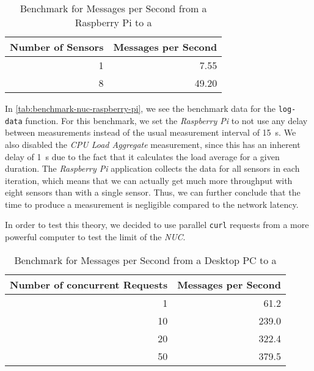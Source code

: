 \begin{table}[H]
  \centering
  \begin{tabular}{|r|r|}
    \hline
    Number of Sensors & Messages per Second \\ \hline
                    1 &                7.55 \\ \hline
                    8 &               49.20 \\ \hline
  \end{tabular}
  \caption{Benchmark for Messages per Second from a Raspberry Pi to a }
  \label{tab:benchmark-nuc-raspberry-pi}
\end{table}

In \autoref{tab:benchmark-nuc-raspberry-pi}, we see the benchmark data for the \texttt{log-data}
function. For this benchmark, we set the \textit{Raspberry Pi} to not use any delay between
measurements instead of the usual measurement interval of \SI{15}{\second}. We also disabled the
\textit{CPU Load Aggregate} measurement, since this has an inherent delay of \SI{1}{\second} due to
the fact that it calculates the load average for a given duration. The \textit{Raspberry Pi}
application collects the data for all sensors in each iteration, which means that we can actually
get much more throughput with eight sensors than with a single sensor. Thus, we can further
conclude that the time to produce a measurement is negligible compared to the network latency.

In order to test this theory, we decided to use parallel \texttt{curl} requests from a more
powerful computer to test the limit of the \textit{NUC}.

\begin{table}[H]
  \centering
  \begin{tabular}{|r|r|}
    \hline
    Number of concurrent Requests & Messages per Second \\ \hline
                                1 &                61.2 \\ \hline
                               10 &               239.0 \\ \hline
                               20 &               322.4 \\ \hline
                               50 &               379.5 \\ \hline
  \end{tabular}
  \caption{Benchmark for Messages per Second from a Desktop PC to a }
  \label{tab:benchmark-nuc-curl}
\end{table}

